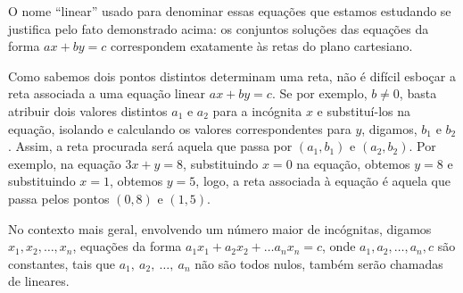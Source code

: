 O nome “linear”{} usado para denominar essas equações que estamos estudando se justifica pelo fato demonstrado acima: os conjuntos soluções das equações da forma $ax+by=c$ correspondem exatamente às retas do plano cartesiano.

Como sabemos dois pontos distintos determinam uma reta, não é difícil esboçar a reta associada a uma equação linear $ax+by = c$. Se por exemplo, $b\neq 0$, basta atribuir dois valores distintos $a_1$ e $a_2$ para a incógnita $x$ e substituí-los na equação, isolando e calculando os valores correspondentes para $y$, digamos, $b_1$ e $b_2$. Assim, a reta procurada será aquela que passa por $(a_1,b_1)$ e $(a_2,b_2)$. Por exemplo, na equação $3x + y = 8$, substituindo $x=0$ na equação, obtemos $y = 8$ e substituindo $x = 1$, obtemos $y=5$, logo, a reta associada à equação é aquela que passa pelos pontos $(0,8)$ e $(1,5)$.  

No contexto mais geral, envolvendo um número maior de incógnitas, digamos $x_1,x_2, \ldots, x_n$, equações da forma $a_1x_1 + a_2x_2 + \ldots a_nx_n = c$, onde $a_1, a_2, \ldots, a_n, c$ são constantes, tais que $a_1, \ a_2, \ \ldots, \ a_n$ não são todos nulos,  também serão chamadas de lineares. 

